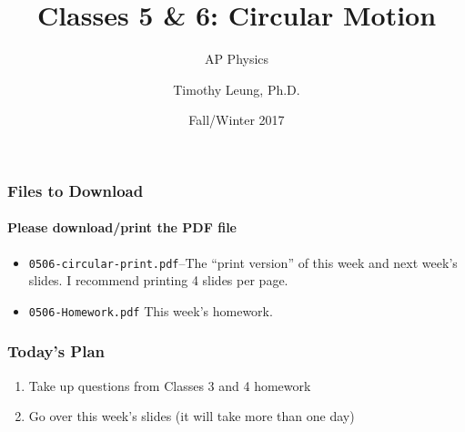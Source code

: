 \documentclass[12pt,compress,aspectratio=169]{beamer}
\title{Classes 5 \& 6: Circular Motion}
\subtitle{AP Physics}
\author[TML]{Timothy Leung, Ph.D.}
\institute{Olympiads School}
\date{Fall/Winter 2017}
\begin{document}
\begin{frame}
  \maketitle
\end{frame}

\begin{frame}
  \frametitle{Files to Download}
  \framesubtitle{Please download/print the PDF file}
  \begin{itemize}
  \item\texttt{0506-circular-print.pdf}--The ``print version'' of this week
    and next week's slides. I recommend printing 4 slides per page.
  \item\texttt{0506-Homework.pdf} This week's homework.
  \end{itemize}
\end{frame}


\begin{frame}
  \frametitle{Today's Plan}
  \begin{enumerate}
  \item Take up questions from Classes 3 and 4 homework
  \item Go over this week's slides (it will take more than one day)
  \end{enumerate}
\end{frame}
\end{document}
